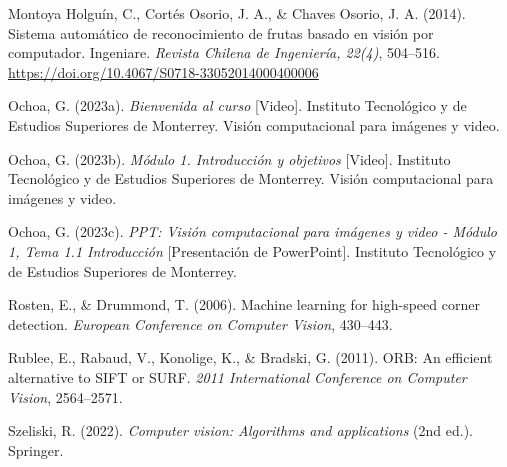 \documentclass[12pt,letterpaper]{article}
\begin{document}
\begin{thebibliography}{99}
Montoya Holguín, C., Cortés Osorio, J. A., \& Chaves Osorio, J. A. (2014). Sistema automático de reconocimiento de frutas basado en visión por computador. Ingeniare. \textit{Revista Chilena de Ingeniería, 22(4)}, 504–516. \url{https://doi.org/10.4067/S0718-33052014000400006}

Ochoa, G. (2023a). \textit{Bienvenida al curso} [Video]. Instituto Tecnológico y de Estudios Superiores de Monterrey. Visión computacional para imágenes y video.

Ochoa, G. (2023b). \textit{Módulo 1. Introducción y objetivos} [Video]. Instituto Tecnológico y de Estudios Superiores de Monterrey. Visión computacional para imágenes y video.

Ochoa, G. (2023c). \textit{PPT: Visión computacional para imágenes y video - Módulo 1, Tema 1.1 Introducción} [Presentación de PowerPoint]. Instituto Tecnológico y de Estudios Superiores de Monterrey.

Rosten, E., \& Drummond, T. (2006). Machine learning for high-speed corner detection. \textit{European Conference on Computer Vision}, 430--443.

Rublee, E., Rabaud, V., Konolige, K., \& Bradski, G. (2011). ORB: An efficient alternative to SIFT or SURF. \textit{2011 International Conference on Computer Vision}, 2564--2571.

Szeliski, R. (2022). \textit{Computer vision: Algorithms and applications} (2nd ed.). Springer.


\end{thebibliography}

% 
%
%
\end{document}
